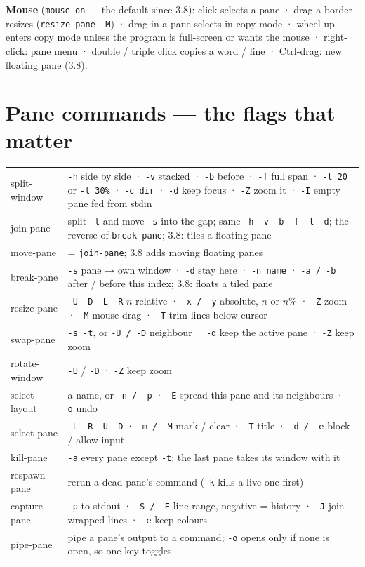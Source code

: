 \documentclass[8pt]{extarticle}
\newcommand\ct[1]{\texttt{#1}}
\begin{document}
\begin{multicols}{2}
\textbf{Mouse} (\ct{mouse on} — the default since 3.8): click selects a pane · drag a border
resizes (\ct{resize-pane -M}) · drag in a pane selects in copy mode · wheel up enters copy mode
unless the program is full-screen or wants the mouse · right-click: pane menu · double / triple
click copies a word / line · Ctrl-drag: new floating pane (3.8).

\section{Pane commands — the flags that matter}
{\scriptsize\setlength{\tabcolsep}{2.5pt}\renewcommand{\arraystretch}{1.05}
\begin{tabular}{@{}>{\ttfamily\raggedright\arraybackslash}p{14mm} L{64mm}@{}}
\toprule
split-window  & \ct{-h} side by side · \ct{-v} stacked · \ct{-b} before · \ct{-f} full span · \ct{-l 20} or \ct{-l 30\%} · \ct{-c dir} · \ct{-d} keep focus · \ct{-Z} zoom it · \ct{-I} empty pane fed from stdin \\
join-pane     & split \ct{-t} and move \ct{-s} into the gap; same \ct{-h -v -b -f -l -d}; the reverse of \ct{break-pane}; 3.8: tiles a floating pane \\
move-pane     & = \ct{join-pane}; 3.8 adds moving floating panes \\
break-pane    & \ct{-s} pane → own window · \ct{-d} stay here · \ct{-n name} · \ct{-a / -b} after / before this index; 3.8: floats a tiled pane \\
resize-pane   & \ct{-U -D -L -R} $n$ relative · \ct{-x / -y} absolute, $n$ or $n$\% · \ct{-Z} zoom · \ct{-M} mouse drag · \ct{-T} trim lines below cursor \\
swap-pane     & \ct{-s -t}, or \ct{-U / -D} neighbour · \ct{-d} keep the active pane · \ct{-Z} keep zoom \\
rotate-window & \ct{-U} / \ct{-D} · \ct{-Z} keep zoom \\
select-layout & a name, or \ct{-n / -p} · \ct{-E} spread this pane and its neighbours · \ct{-o} undo \\
select-pane   & \ct{-L -R -U -D} · \ct{-m / -M} mark / clear · \ct{-T} title · \ct{-d / -e} block / allow input \\
kill-pane     & \ct{-a} every pane except \ct{-t}; the last pane takes its window with it \\
respawn-pane  & rerun a dead pane's command (\ct{-k} kills a live one first) \\
capture-pane  & \ct{-p} to stdout · \ct{-S / -E} line range, negative = history · \ct{-J} join wrapped lines · \ct{-e} keep colours \\
pipe-pane     & pipe a pane's output to a command; \ct{-o} opens only if none is open, so one key toggles \\
\bottomrule
\end{tabular}}


\end{multicols}
\end{document}
